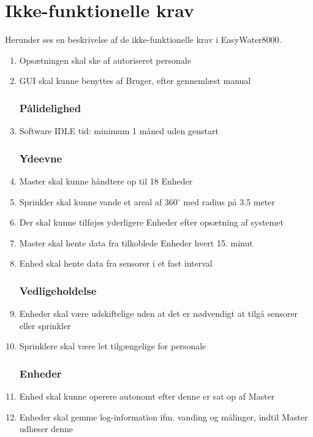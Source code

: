 \section*{Ikke-funktionelle krav}
Herunder ses en beskrivelse af de ikke-funktionelle krav i EasyWater8000.
\begin{enumerate}

\subsubsection*{Brugbarhed}
\item Opsætningen skal ske af autoriseret personale
\item GUI skal kunne benyttes af Bruger, efter gennemlæst manual


\subsubsection*{Pålidelighed}
\item Software IDLE tid: minimum 1 måned uden genstart


\subsubsection*{Ydeevne}
\item Master skal kunne håndtere op til 18 Enheder
\item Sprinkler skal kunne vande et areal af 360$^{\circ}$ med radius på 3.5 meter
\item Der skal kunne tilføjes yderligere Enheder efter opsætning af systemet
\item Master skal hente data fra tilkoblede Enheder hvert 15. minut
\item Enhed skal hente data fra sensorer i et fast interval


\subsubsection*{Vedligeholdelse}
\item Enheder skal være udskiftelige uden at det er nødvendigt at tilgå sensorer eller sprinkler
\item Sprinklere skal være let tilgængelige for personale


\subsubsection*{Enheder}
\item Enhed skal kunne operere autonomt efter denne er sat op af Master
\item Enheder skal gemme log-information ifm. vanding og målinger, indtil Master udlæser denne

\end{enumerate}


